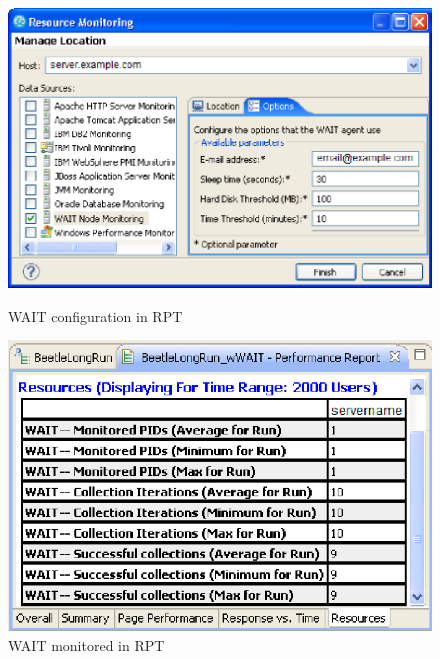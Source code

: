 \documentclass[runningheads,a4paper]{llncs}
\begin{document}
\begin{figure}
\centering
\begin{minipage}[b]{.50\textwidth}

\centering
\includegraphics[totalheight=.25\textheight,width=1.0\textwidth]{WAIT-config}
\caption{WAIT configuration in RPT}
\label{fig_config}

\end{minipage}\qquad
\begin{minipage}[b]{.44\textwidth}

\centering
\includegraphics[totalheight=.25\textheight,width=1.0\textwidth]{WAIT-monitoring}
\caption{WAIT monitored in RPT}
\label{fig_mon}

\end{minipage}
\end{figure}
\vspace{-5pt}
\end{document}
